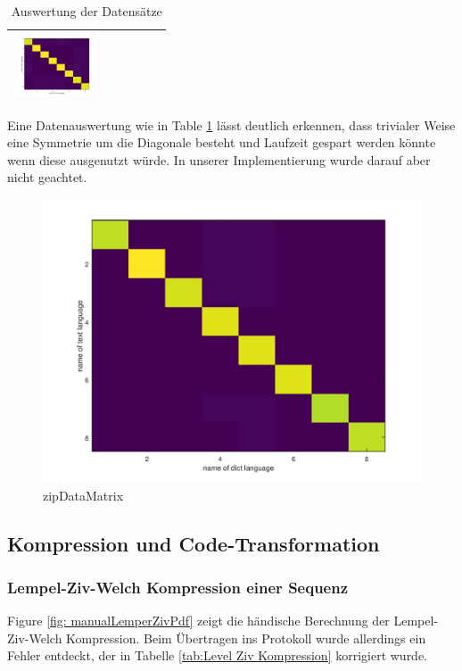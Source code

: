 \documentclass[12pt,german]{article}
\begin{document}
\begin{table}[H]
\begin{tabular}{| l | c | c | c | c | c |}
    \includegraphics[width=2.5cm]{../images/witzData/witzData.jpg} \\
    \hline
  \end{tabular}
  \caption{Auswertung der Datensätze}
  \label{tab:datenAuswertungText}
\end{table}


Eine Datenauswertung wie in Table \ref{tab:datenAuswertungText} lässt deutlich erkennen, dass trivialer Weise eine Symmetrie um die Diagonale besteht und Laufzeit gespart werden könnte wenn diese ausgenutzt würde. In unserer Implementierung wurde darauf aber nicht geachtet. 


\begin{figure}[H]
	\centering
	\includegraphics[width=12cm]{images/resultZipData.jpg}
	\caption{zipDataMatrix}
	\label{fig: zipDataMatrix}
\end{figure}

\newpage

\label{fig: calculateMatrixOctaveCode}


\subsection{Kompression und Code-Transformation}
\subsubsection{Lempel-Ziv-Welch Kompression einer Sequenz}
Figure \ref{fig: manualLemperZivPdf} zeigt die händische Berechnung der Lempel-Ziv-Welch Kompression. Beim Übertragen ins Protokoll wurde allerdings ein Fehler entdeckt, der in Tabelle \ref{tab:Level Ziv Kompression} korrigiert wurde.
\end{document}

